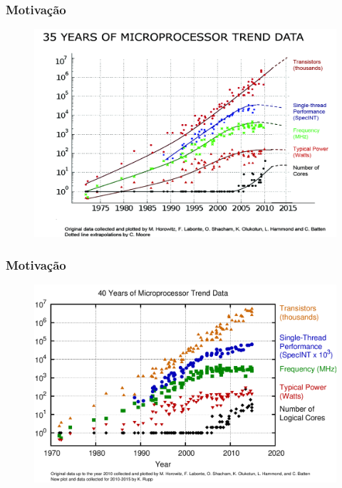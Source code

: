 \documentclass[10pt, compress]{beamer}
\begin{document}
\begin{frame}[fragile]
    \frametitle{Motivação}
    \begin{figure}[H]
        \centering
        \includegraphics[width=1\textwidth]{35years}
    \end{figure}%
    \let\thefootnote\relax{}
\end{frame}

\begin{frame}[fragile]
    \frametitle{Motivação}
    \begin{figure}[H]
        \centering
        \includegraphics[width=1\textwidth]{40years}
    \end{figure}%
    \let\thefootnote\relax{}
\end{frame}
\end{document}
